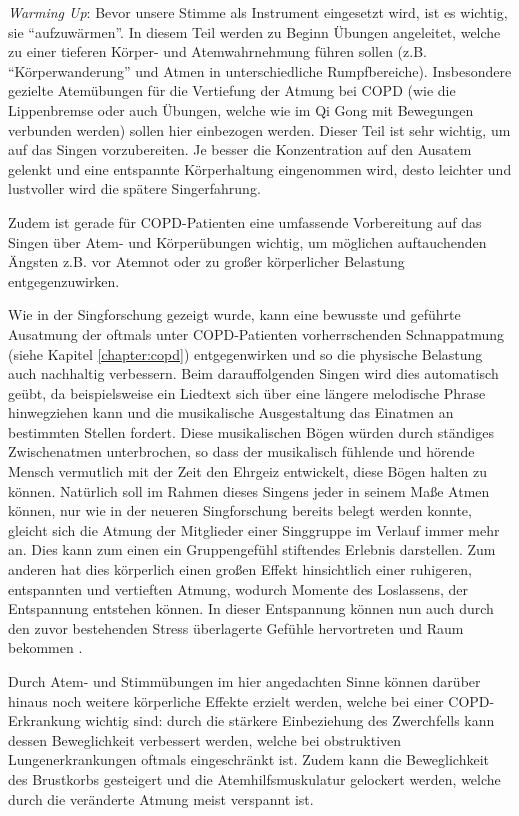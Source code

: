 \emph{Warming Up}: 
Bevor unsere Stimme als Instrument eingesetzt wird, ist es wichtig, sie "`aufzuwärmen"'. In diesem Teil werden zu Beginn Übungen angeleitet, welche zu einer tieferen Körper- und Atemwahrnehmung führen sollen (z.B. "`Körperwanderung"' und Atmen in unterschiedliche Rumpfbereiche). Insbesondere gezielte Atemübungen für die Vertiefung der Atmung bei COPD (wie die Lippenbremse oder auch Übungen, welche wie im Qi Gong mit Bewegungen verbunden werden) sollen hier einbezogen werden. Dieser Teil ist sehr wichtig, um auf das Singen vorzubereiten. Je besser die Konzentration auf den Ausatem gelenkt und eine entspannte Körperhaltung eingenommen wird, desto leichter und lustvoller wird die spätere Singerfahrung. 

Zudem ist gerade für COPD-Patienten eine umfassende Vorbereitung auf das Singen über Atem- und Körperübungen wichtig, um möglichen auftauchenden Ängsten z.B. vor Atemnot oder zu großer körperlicher Belastung entgegenzuwirken. 

Wie in der Singforschung gezeigt wurde, kann eine bewusste und geführte Ausatmung der oftmals unter COPD-Patienten vorherrschenden Schnappatmung (siehe Kapitel \ref{chapter:copd}) entgegenwirken und so die physische Belastung auch nachhaltig verbessern. Beim darauffolgenden Singen wird dies automatisch geübt, da beispielsweise ein Liedtext sich über eine längere melodische Phrase hinwegziehen kann und die musikalische Ausgestaltung das Einatmen an bestimmten Stellen fordert. Diese musikalischen Bögen würden durch ständiges Zwischenatmen unterbrochen, so dass der musikalisch fühlende und hörende Mensch vermutlich mit der Zeit den Ehrgeiz entwickelt, diese Bögen halten zu können. Natürlich soll im Rahmen dieses Singens jeder in seinem Maße Atmen können, nur wie in der neueren Singforschung bereits belegt werden konnte, gleicht sich die Atmung der Mitglieder einer Singgruppe im Verlauf immer mehr an. Dies kann zum einen ein  Gruppengefühl stiftendes Erlebnis darstellen. Zum anderen hat dies körperlich einen großen Effekt hinsichtlich einer ruhigeren, entspannten und vertieften Atmung, wodurch Momente des Loslassens, der Entspannung entstehen können. In dieser Entspannung können nun auch durch den zuvor bestehenden Stress überlagerte Gefühle hervortreten und Raum bekommen \autocite[vgl.][59]{ehrmann2004}. 

Durch Atem- und Stimmübungen im hier angedachten Sinne können darüber hinaus noch weitere körperliche Effekte erzielt werden, welche bei einer COPD-Erkrankung wichtig sind: durch die stärkere Einbeziehung des Zwerchfells kann dessen Beweglichkeit verbessert werden, welche bei obstruktiven Lungenerkrankungen oftmals eingeschränkt ist. Zudem kann die Beweglichkeit des Brustkorbs gesteigert und die Atemhilfsmuskulatur gelockert werden, welche durch die veränderte Atmung meist verspannt ist. 

